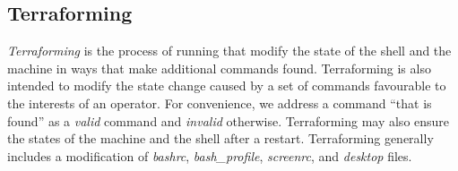 \subsection{Terraforming}\label{terraform}\label{terraforms}\label{terraforming}

\emph{Terraforming} is the process of running  that modify the state of the shell and the machine in ways that make additional commands found. Terraforming is also intended to modify the state change caused by a set of commands favourable to the interests of an operator. For convenience, we address a command ``that is found'' as a \emph{valid} command and \emph{invalid} otherwise. Terraforming may also ensure the states of the machine and the shell after a restart. Terraforming generally includes a modification of \emph{bashrc}, \emph{bash\_profile}, \emph{screenrc}, and \emph{desktop} files.